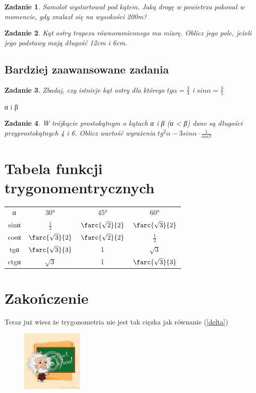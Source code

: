 \documentclass[12pt,a4paper]{article}
\newtheorem{zad}{Zadanie}[section]
\begin{document}
\begin{zad}
Samolot wystartował pod kątem. Jaką drogę w powietrzu pokonał w momencie, gdy znalazł się na wysokości 200m?
\end{zad}

\begin{zad}
Kąt ostry trapezu równoramiennego ma miarę. Oblicz jego pole, jeżeli jego podstawy mają długość 12cm i 6cm.
\end{zad}

\subsection{Bardziej zaawansowane zadania}


\begin{zad}
Zbadaj, czy istnieje kąt ostry dla którego $tgα=\frac{3}{4}$ i $sinα=\frac{3}{5}$
\end{zad}
α i β
\begin{zad}
W trójkącie prostokątnym o kątach α i β (α < β) dane są długości przyprostokątnych 4 i 6. Oblicz wartość wyrażenia $tg^{2}α-3sinα·\frac{1}{cosβ}$
\end{zad}

\section{Tabela funkcji trygonomentrycznych}

\begin{tabular}{|c|c|c|c|} \hline
α & 30° & 45° & 60° \\
sinα & $\frac{1}{2}$ & $\farc{\sqrt{2}}{2}$ &   $\farc{\sqrt{3}}{2}$ \\
cosα & $\farc{\sqrt{3}}{2}$ & $\farc{\sqrt{2}}{2}$ & $\frac{1}{2}$\\
tgα &   $\farc{\sqrt{3}}{3}$& 1  &  $\sqrt{3}$\\
ctgα & $\sqrt{3}$ & 1 & $\farc{\sqrt{3}}{3}$\\
\hline \hline
\end{tabular}


\section{Zakończenie}
Teraz już wiesz że trygonometria nie jest tak cięzka jak równanie (\ref{delta})

\begin{figure}
\includegraphics[width=3cm, angle=25]{einstein}
\end{figure}
\end{document}
